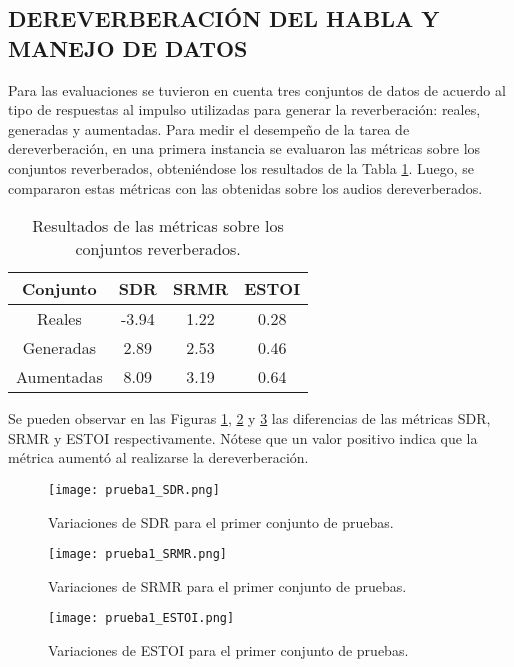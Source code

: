\subsection[Dereverberación del habla y manejo de datos]{DEREVERBERACIÓN DEL HABLA Y MANEJO DE DATOS}

Para las evaluaciones se tuvieron en cuenta tres conjuntos de datos de acuerdo al tipo de respuestas al impulso utilizadas para generar la reverberación: reales, generadas y aumentadas. Para medir el desempeño de la tarea de dereverberación, en una primera instancia se evaluaron las métricas sobre los conjuntos reverberados, obteniéndose los resultados de la Tabla \ref{table:resultados_reverb}. Luego, se compararon estas métricas con las obtenidas sobre los audios dereverberados. 

\begin{table}[H]
\centering
\caption{Resultados de las métricas sobre los conjuntos reverberados.}
\begin{tabular}{|c|c|c|c|}
\hline
Conjunto   & \textbf{SDR} & \textbf{SRMR} & \textbf{ESTOI} \\ \hline
Reales     & -3.94        & 1.22          & 0.28           \\
Generadas  & 2.89        & 2.53          & 0.46           \\
Aumentadas & 8.09        & 3.19          & 0.64           \\ \hline
\end{tabular}
\label{table:resultados_reverb}
\end{table}

Se pueden observar en las Figuras \ref{fig:1_SDR}, \ref{fig:1_SRMR} y \ref{fig:1_ESTOI} las diferencias de las métricas SDR, SRMR y ESTOI respectivamente.  Nótese que un valor positivo indica que la métrica aumentó al realizarse la dereverberación.


\begin{figure}[H]
	\centering{}
	\texttt{[image: prueba1\_SDR.png]}
	\caption{Variaciones de SDR para el primer conjunto de pruebas.}
	\label{fig:1_SDR}
\end{figure}

\begin{figure}[H]
	\centering{}
	\texttt{[image: prueba1\_SRMR.png]}
	\caption{Variaciones de SRMR para el primer conjunto de pruebas.}
	\label{fig:1_SRMR}
\end{figure}

\begin{figure}[H]
	\centering{}
	\texttt{[image: prueba1\_ESTOI.png]}
	\caption{Variaciones de ESTOI para el primer conjunto de pruebas.}
	\label{fig:1_ESTOI}
\end{figure}

